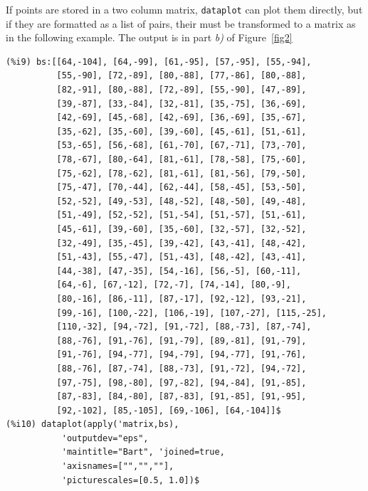 \documentclass[12pt,a4paper]{article}
\begin{document}
\begin{description}
If points are stored in a two column matrix, \verb|dataplot| can plot them directly, but if they are formatted as a list of pairs, their must be transformed to a matrix as in the following example. The output is in part \emph{b)} of Figure~\ref{fig2}
\begin{verbatim}
(%i9) bs:[[64,-104], [64,-99], [61,-95], [57,-95], [55,-94],
          [55,-90], [72,-89], [80,-88], [77,-86], [80,-88], 
          [82,-91], [80,-88], [72,-89], [55,-90], [47,-89], 
          [39,-87], [33,-84], [32,-81], [35,-75], [36,-69], 
          [42,-69], [45,-68], [42,-69], [36,-69], [35,-67], 
          [35,-62], [35,-60], [39,-60], [45,-61], [51,-61], 
          [53,-65], [56,-68], [61,-70], [67,-71], [73,-70], 
          [78,-67], [80,-64], [81,-61], [78,-58], [75,-60], 
          [75,-62], [78,-62], [81,-61], [81,-56], [79,-50], 
          [75,-47], [70,-44], [62,-44], [58,-45], [53,-50], 
          [52,-52], [49,-53], [48,-52], [48,-50], [49,-48], 
          [51,-49], [52,-52], [51,-54], [51,-57], [51,-61], 
          [45,-61], [39,-60], [35,-60], [32,-57], [32,-52], 
          [32,-49], [35,-45], [39,-42], [43,-41], [48,-42], 
          [51,-43], [55,-47], [51,-43], [48,-42], [43,-41], 
          [44,-38], [47,-35], [54,-16], [56,-5], [60,-11], 
          [64,-6], [67,-12], [72,-7], [74,-14], [80,-9], 
          [80,-16], [86,-11], [87,-17], [92,-12], [93,-21], 
          [99,-16], [100,-22], [106,-19], [107,-27], [115,-25], 
          [110,-32], [94,-72], [91,-72], [88,-73], [87,-74], 
          [88,-76], [91,-76], [91,-79], [89,-81], [91,-79], 
          [91,-76], [94,-77], [94,-79], [94,-77], [91,-76], 
          [88,-76], [87,-74], [88,-73], [91,-72], [94,-72], 
          [97,-75], [98,-80], [97,-82], [94,-84], [91,-85], 
          [87,-83], [84,-80], [87,-83], [91,-85], [91,-95], 
          [92,-102], [85,-105], [69,-106], [64,-104]]$
(%i10) dataplot(apply('matrix,bs),
           'outputdev="eps",
           'maintitle="Bart", 'joined=true,
           'axisnames=["","",""],
           'picturescales=[0.5, 1.0])$
\end{verbatim}



\end{description}
\end{document}
